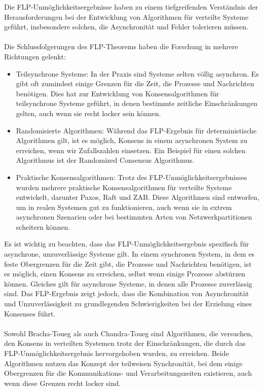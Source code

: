 Die FLP-Unmöglichkeitsergebnisse haben zu einem tiefgreifenden Verständnis der Herausforderungen bei der Entwicklung von Algorithmen für verteilte Systeme geführt, insbesondere solchen, die Asynchronität und Fehler tolerieren müssen.
\\\\
Die Schlussfolgerungen des FLP-Theorems haben die Forschung in mehrere Richtungen gelenkt:
\begin{itemize}
\item Teilsynchrone Systeme: In der Praxis sind Systeme selten völlig asynchron. Es gibt oft zumindest einige Grenzen für die Zeit, die Prozesse und Nachrichten benötigen. Dies hat zur Entwicklung von Konsensalgorithmen für teilsynchrone Systeme geführt, in denen bestimmte zeitliche Einschränkungen gelten, auch wenn sie recht locker sein können.
\item Randomisierte Algorithmen: Während das FLP-Ergebnis für deterministische Algorithmen gilt, ist es möglich, Konsens in einem asynchronen System zu erreichen, wenn wir Zufallszahlen einsetzen. Ein Beispiel für einen solchen Algorithmus ist der Randomized Consensus Algorithmus.
\item Praktische Konsensalgorithmen: Trotz des FLP-Unmöglichkeitsergebnisses wurden mehrere praktische Konsensalgorithmen für verteilte Systeme entwickelt, darunter Paxos, Raft und ZAB. Diese Algorithmen sind entworfen, um in realen Systemen gut zu funktionieren, auch wenn sie in extrem asynchronen Szenarien oder bei bestimmten Arten von Netzwerkpartitionen scheitern können.
\end{itemize}
Es ist wichtig zu beachten, dass das FLP-Unmöglichkeitsergebnis spezifisch für asynchrone, unzuverlässige Systeme gilt. In einem synchronen System, in dem es feste Obergrenzen für die Zeit gibt, die Prozesse und Nachrichten benötigen, ist es möglich, einen Konsens zu erreichen, selbst wenn einige Prozesse abstürzen können. Gleiches gilt für asynchrone Systeme, in denen alle Prozesse zuverlässig sind. Das FLP-Ergebnis zeigt jedoch, dass die Kombination von Asynchronität und Unzuverlässigkeit zu grundlegenden Schwierigkeiten bei der Erzielung eines Konsenses führt.
\\\\
Sowohl Bracha-Toueg als auch Chandra-Toueg sind Algorithmen, die versuchen, den Konsens in verteilten Systemen trotz der Einschränkungen, die durch das FLP-Unmöglichkeitsergebnis hervorgehoben wurden, zu erreichen. Beide Algorithmen nutzen das Konzept der teilweisen Synchronität, bei dem einige Obergrenzen für die Kommunikations- und Verarbeitungszeiten existieren, auch wenn diese Grenzen recht locker sind.
